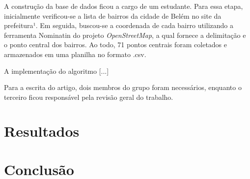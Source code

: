 \documentclass[12pt]{article}
\begin{document}
A construção da base de dados ficou a cargo de um estudante. Para essa etapa, inicialmente verificou-se a lista de bairros da cidade de Belém no site da prefeitura¹. Em seguida, buscou-se a coordenada de cada bairro utilizando a ferramenta Nominatin do projeto \textit{OpenStreetMap}, a qual fornece a delimitação e o ponto central dos bairros. Ao todo, 71 pontos centrais foram coletados e armazenados em uma planilha no formato .csv.

A implementação do algoritmo [...]

Para a escrita do artigo, dois membros do grupo foram necessários, enquanto o terceiro ficou responsável pela revisão geral do trabalho. 



\section{Resultados}

\section{Conclusão}




\end{document}
